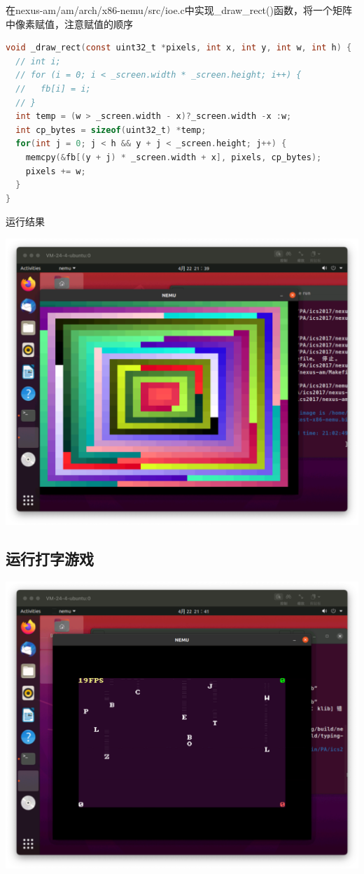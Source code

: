 \documentclass[UTF8,a4paper,10pt]{ctexart}
\begin{document}
在nexus-am/am/arch/x86-nemu/src/ioe.c中实现\_draw\_rect()函数，将一个矩阵中像素赋值，注意赋值的顺序
\begin{lstlisting}[language = C]
void _draw_rect(const uint32_t *pixels, int x, int y, int w, int h) {
  // int i;
  // for (i = 0; i < _screen.width * _screen.height; i++) {
  //   fb[i] = i;
  // }
  int temp = (w > _screen.width - x)?_screen.width -x :w;
  int cp_bytes = sizeof(uint32_t) *temp;
  for(int j = 0; j < h && y + j < _screen.height; j++) {
    memcpy(&fb[(y + j) * _screen.width + x], pixels, cp_bytes);
    pixels += w;
  }
}
\end{lstlisting}
运行结果
\begin{center}
  \includegraphics*[scale = 0.2]{h}
\end{center}
\subsection{运行打字游戏}
\begin{center}
  \includegraphics*[scale = 0.35]{game}
\end{center}
\end{document}
